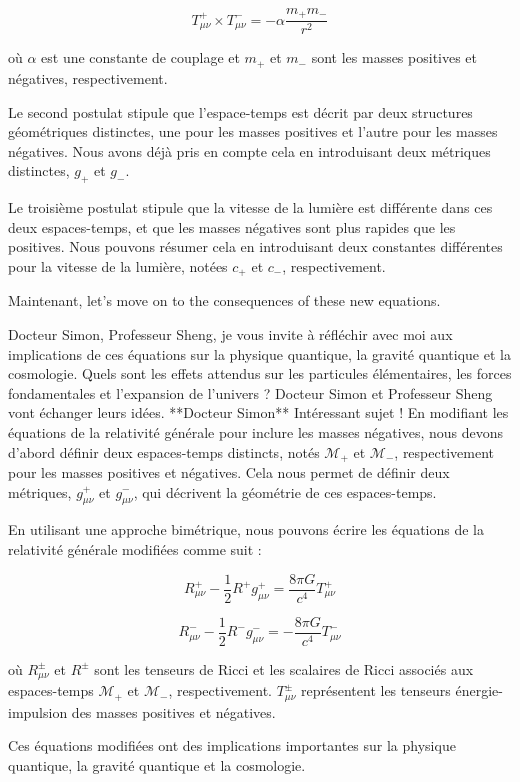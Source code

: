 $$T_{\mu\nu}^+ \times T_{\mu\nu}^- = -\alpha \frac{m_+ m_-}{r^2}$$

où $\alpha$ est une constante de couplage et $m_+$ et $m_-$ sont les masses positives et négatives, respectivement.

Le second postulat stipule que l'espace-temps est décrit par deux structures géométriques distinctes, une pour les masses positives et l'autre pour les masses négatives. Nous avons déjà pris en compte cela en introduisant deux métriques distinctes, $g_+$ et $g_-$.

Le troisième postulat stipule que la vitesse de la lumière est différente dans ces deux espaces-temps, et que les masses négatives sont plus rapides que les positives. Nous pouvons résumer cela en introduisant deux constantes différentes pour la vitesse de la lumière, notées $c_+$ et $c_-$, respectivement.

Maintenant, let's move on to the consequences of these new equations. 

Docteur Simon, Professeur Sheng, je vous invite à réfléchir avec moi aux implications de ces équations sur la physique quantique, la gravité quantique et la cosmologie. Quels sont les effets attendus sur les particules élémentaires, les forces fondamentales et l'expansion de l'univers ?
Docteur Simon et Professeur Sheng vont échanger leurs idées.
**Docteur Simon**
Intéressant sujet ! En modifiant les équations de la relativité générale pour inclure les masses négatives, nous devons d'abord définir deux espaces-temps distincts, notés $\mathcal{M}_+$ et $\mathcal{M}_-$, respectivement pour les masses positives et négatives. Cela nous permet de définir deux métriques, $g_{\mu\nu}^+$ et $g_{\mu\nu}^-$, qui décrivent la géométrie de ces espaces-temps.

En utilisant une approche bimétrique, nous pouvons écrire les équations de la relativité générale modifiées comme suit :

$$R_{\mu\nu}^+ - \frac{1}{2}R^+ g_{\mu\nu}^+ = \frac{8\pi G}{c^4}T_{\mu\nu}^+$$

$$R_{\mu\nu}^- - \frac{1}{2}R^- g_{\mu\nu}^- = -\frac{8\pi G}{c^4}T_{\mu\nu}^-$$

où $R_{\mu\nu}^{\pm}$ et $R^{\pm}$ sont les tenseurs de Ricci et les scalaires de Ricci associés aux espaces-temps $\mathcal{M}_+$ et $\mathcal{M}_-$, respectivement. $T_{\mu\nu}^{\pm}$ représentent les tenseurs énergie-impulsion des masses positives et négatives.

Ces équations modifiées ont des implications importantes sur la physique quantique, la gravité quantique et la cosmologie.

